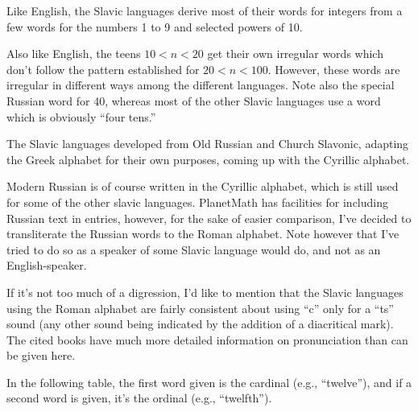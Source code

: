 \documentclass[12pt]{article}
\begin{document}
Like English, the Slavic languages derive most of their words for integers from a few words for the numbers 1 to 9 and selected powers of 10.

Also like English, the teens $10 < n < 20$ get their own irregular words which don't follow the pattern established for $20 < n < 100$. However, these words are irregular in different ways among the different languages. Note also the special Russian word for 40, whereas most of the other Slavic languages use a word which is obviously ``four tens.''

The Slavic languages developed from Old Russian and Church Slavonic, adapting the Greek alphabet for their own purposes, coming up with the Cyrillic alphabet.

Modern Russian is of course written in the Cyrillic alphabet, which is still used for some of the other slavic languages. PlanetMath has facilities for including Russian text in entries, however, for the sake of easier comparison, I've decided to transliterate the Russian words to the Roman alphabet. Note however that I've tried to do so as a speaker of some Slavic language would do, and not as an English-speaker.

If it's not too much of a digression, I'd like to mention that the Slavic languages using the Roman alphabet are fairly consistent about using ``c'' only for a ``ts'' sound (any other sound being indicated by the addition of a diacritical mark). The cited books have much more detailed information on pronunciation than can be given here.

In the following table, the first word given is the cardinal (e.g., ``twelve''), and if a second word is given, it's the ordinal (e.g., ``twelfth'').
\end{document}
